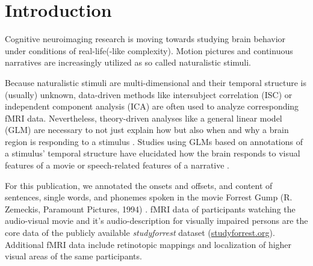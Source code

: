 \documentclass[10pt,a4paper,twocolumn]{article}
\begin{document}
\clearpage

\section*{Introduction}

Cognitive neuroimaging research is moving towards studying brain behavior
under conditions of real-life(-like complexity). Motion pictures \citep{hasson2008neurocinematics} and continuous narratives \citep{honey2012not, lerner2011topographic} are increasingly utilized as so called naturalistic stimuli.

Because naturalistic stimuli are multi-dimensional and their temporal structure
is (usually) unknown, data-driven methods like intersubject correlation
(ISC)\citep{hasson2004intersubject} or independent component analysis
(ICA)\citep{bartels2004chronoarchitecture} are often used to analyze
corresponding fMRI data. Nevertheless, theory-driven analyses like a general
linear model (GLM) are necessary to not just explain how but also when and why a
brain region is responding to a stimulus \citep{hamilton2018revolution}. Studies
using GLMs based on annotations of a stimulus' temporal structure have
elucidated how the brain responds to visual features of a movie
\citep{bartels2004mapping} or speech-related features of a narrative
\citep{rocca2019language}.

For this publication, we annotated the onsets and offsets, and content of
sentences, single words, and phonemes spoken in the movie Forrest Gump (R.
Zemeckis, Paramount Pictures, 1994) \citep{ForrestGumpMovie}. fMRI data of
participants watching the audio-visual movie \citep{hanke2016simultaneous} and
it's audio-description for visually impaired persons \citep{hanke2014audiomovie}
are the core data of the publicly available \textit{studyforrest} dataset
(\href{www.studyforrest.org}{studyforrest.org}). Additional fMRI data
\citep{sengupta2016extension} include retinotopic mappings and localization of
higher visual areas of the same participants.
\end{document}
